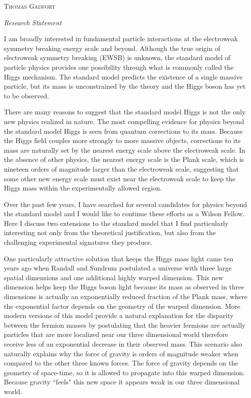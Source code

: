 \documentclass[12pt]{article}
\newcommand{\hr}{\centerline{\hskip 30mm\hrulefill\hskip 30mm}}
\begin{document}
\begin{center}
{\LARGE \textsc{Thomas Gadfort}}
\smallskip

\emph{Research Statement}
\end{center}

\vspace{-11pt}
\hr

\bigskip
 
I am broadly interested in fundamental particle interactions at the electroweak symmetry breaking energy scale and beyond. Although the true origin of electroweak symmetry breaking (EWSB) is unknown, the standard model of particle physics provides one possibility through what is commonly called the Higgs mechanism. The standard model predicts the existence of a single massive particle, but its mass is unconstrained by the theory and the Higgs boson has yet to be observed.

There are many reasons to suggest that the standard model Higgs is not the only new physics realized in nature. The most compelling evidence for physics beyond the standard model Higgs is seen from quantum corrections to its mass. Because the Higgs field couples more strongly to more massive objects, corrections to its mass are naturally set by the nearest energy scale above the electroweak scale. In the absence of other physics, the nearest energy scale is the Plank scale, which is nineteen orders of magnitude larger than the electroweak scale, suggesting that some other new energy scale must exist near the electroweak scale to keep the Higgs mass within the experimentally allowed region.

Over the past few years, I have searched for several candidates for physics beyond the standard model and I would like to continue these efforts as a Wilson Fellow. Here I discuss two extensions to the standard model that I find particularly interesting not only from the theoretical justification, but also from the challenging experimental signatures they produce.

One particularly attractive solution that keeps the Higgs mass light came ten years ago when Randall and Sundrum postulated a universe with three large spatial dimensions and one additional highly warped dimension. This new dimension helps keep the Higgs boson light because its mass as observed in three dimensions is actually an exponentially reduced fraction of the Plank mass, where the exponential factor depends on the geometry of the warped dimension. More modern versions of this model provide a natural explanation for the disparity between the fermion masses by postulating that the heavier fermions are actually particles that are more localized near our three dimensional world therefore receive less of an exponential decrease in their observed mass. This scenario also naturally explains why the force of gravity is orders of magnitude weaker when compared to the other three known forces. The force of gravity depends on the geometry of space-time, so it is allowed to propagate into this warped dimension. Because gravity ``feels" this new space it appears weak in our three dimensional world.
\end{document}
